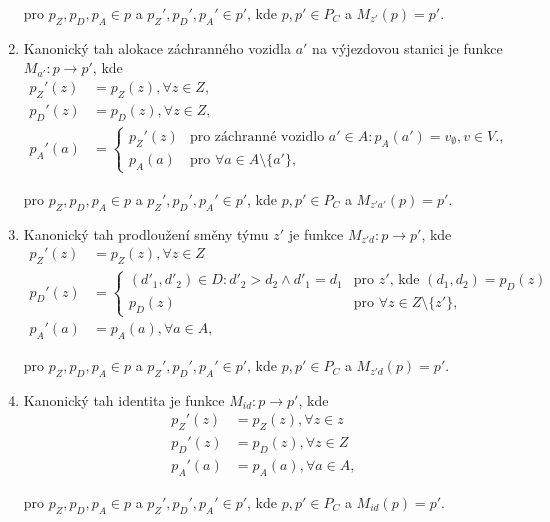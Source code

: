 \begin{definice}
\begin{enumerate}
      pro $p_Z, p_D, p_A \in p$ a $p_Z', p_D', p_A' \in p'$, kde $p, p' \in P_C$ a $M_{z'}(p) = p'$.

    \item
      Kanonický tah alokace záchranného vozidla $a'$ na výjezdovou stanici je funkce $M_{a'} : p \rightarrow p'$, kde
      \begin{align*}
        p_Z'(z) &= p_Z(z), \forall z \in Z,
        \\
        p_D'(z) &= p_D(z), \forall z \in Z,
        \\
        p_A'(a) &=
        \begin{cases}
          p_Z'(z) & \text{pro záchranné vozidlo $a' \in A \colon p_A(a') = v_{\emptyset}, v \in V$.}, \\
          p_A(a) & \text{pro $\forall a \in A \setminus \{ a' \}$},
        \end{cases}
      \end{align*}

      pro $p_Z, p_D, p_A \in p$ a $p_Z', p_D', p_A' \in p'$, kde $p, p' \in P_C$ a $M_{z'a'}(p) = p'$.

    \item
      Kanonický tah prodloužení směny týmu $z'$ je funkce $M_{z'd} : p \rightarrow p'$, kde
      \begin{align*}
        p_Z'(z) &= p_Z(z), \forall z \in Z \\
        p_D'(z) &=
          \begin{cases}
            (d'_1, d'_2) \in D \colon d'_2 > d_2 \land d'_1 = d_1  & \text{pro $z'$, kde $(d_1, d_2) = p_{D}(z)$} \\
            p_D(z) & \text{pro $\forall z \in Z \setminus \{ z' \}$},
          \end{cases}
          \\
        p_A'(a) &= p_A(a), \forall a \in A,
      \end{align*}

      pro $p_Z, p_D, p_A \in p$ a $p_Z', p_D', p_A' \in p'$, kde $p, p' \in P_C$ a $M_{z'd}(p) = p'$.

    \item
      Kanonický tah identita je funkce $M_{id}: p \rightarrow p'$, kde
      \begin{align*}
        p_Z'(z) &= p_Z(z), \forall z \in z \\
        p_D'(z) &= p_D(z), \forall z \in Z \\
        p_A'(a) &= p_A(a), \forall a \in A,
      \end{align*}

      pro $p_Z, p_D, p_A \in p$ a $p_Z', p_D', p_A' \in p'$, kde $p, p' \in P_C$ a $M_{id}(p) = p'$.
  \end{enumerate}

\end{definice}


